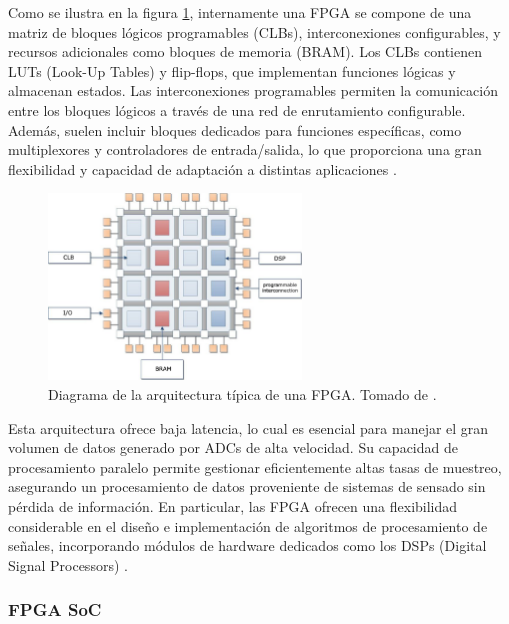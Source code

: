 \documentclass[]{book}
\begin{document}
\noindent Como se ilustra en la figura \ref{fig:fpga_arch}, internamente una FPGA se compone de una matriz de bloques lógicos programables (CLBs), interconexiones configurables, y recursos adicionales como bloques de memoria (BRAM). Los CLBs contienen LUTs (Look-Up Tables) y flip-flops, que implementan funciones lógicas y almacenan estados. Las interconexiones programables permiten la comunicación entre los bloques lógicos a través de una red de enrutamiento configurable. Además, suelen incluir bloques dedicados para funciones específicas, como multiplexores y controladores de entrada/salida, lo que proporciona una gran flexibilidad y capacidad de adaptación a distintas aplicaciones \cite{bravo2020new}.\\

\begin{figure}[h]
    \centering
    \includegraphics[width=0.6\textwidth]{fpga_arch.png}
    \caption{Diagrama de la arquitectura típica de una FPGA. Tomado de \cite{Rucci2018heterogeneos}.}
    \label{fig:fpga_arch}
\end{figure}

\noindent Esta arquitectura ofrece baja latencia, lo cual es esencial para manejar el gran volumen de datos generado por ADCs de alta velocidad. Su capacidad de procesamiento paralelo permite gestionar eficientemente altas tasas de muestreo, asegurando un procesamiento de datos proveniente de sistemas de sensado sin pérdida de información. En particular, las FPGA ofrecen una flexibilidad considerable en el diseño e implementación de algoritmos de procesamiento de señales, incorporando módulos de hardware dedicados como los DSPs (Digital Signal Processors) \cite{meyer2007digital}.\\

\subsubsection{FPGA SoC}
\end{document}
